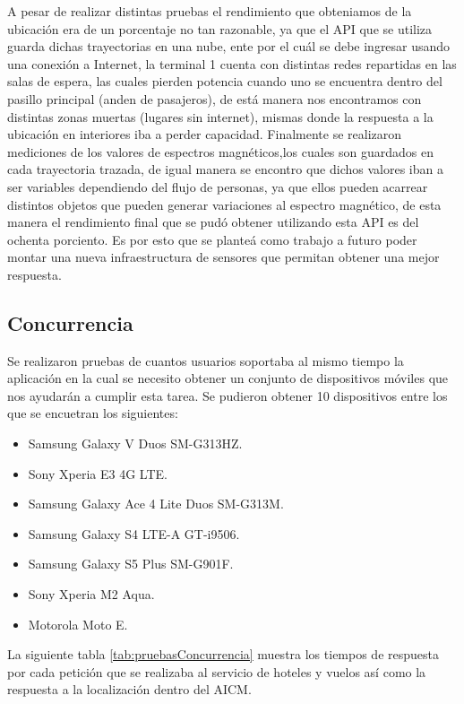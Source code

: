 A pesar de realizar distintas pruebas el rendimiento que obteniamos de la ubicación era de un porcentaje no tan razonable, ya que 
el API que se utiliza guarda dichas trayectorias en una nube, ente por el cuál se debe ingresar usando una conexión a Internet, 
la terminal 1 cuenta con distintas redes repartidas en las salas de espera, las cuales pierden potencia cuando uno se encuentra dentro 
del pasillo principal (anden de pasajeros), de está manera nos encontramos con distintas zonas muertas (lugares sin internet), 
mismas donde la respuesta a la ubicación en interiores iba a perder capacidad. 
Finalmente se realizaron mediciones de los valores de espectros magnéticos,los cuales son guardados en cada trayectoria trazada, 
de igual manera se encontro que dichos valores iban a ser variables dependiendo del flujo de personas, ya que ellos pueden acarrear 
distintos objetos que pueden generar variaciones al espectro magnético, de esta manera el rendimiento final que se pudó obtener utilizando 
esta API es del ochenta porciento. Es por esto que se planteá como trabajo a futuro poder montar una nueva infraestructura de sensores 
que permitan obtener una mejor respuesta.
\clearpage

\subsection{Concurrencia}
Se realizaron pruebas de cuantos usuarios soportaba al mismo tiempo la aplicación en la cual se necesito obtener un conjunto de 
dispositivos móviles que nos ayudarán a cumplir esta tarea. Se pudieron obtener 10 dispositivos entre los que se encuetran los siguientes: 

\begin{itemize}
\item Samsung Galaxy V Duos SM-G313HZ.
\item Sony Xperia E3 4G LTE.
\item Samsung Galaxy Ace 4 Lite Duos SM-G313M.
\item Samsung Galaxy S4 LTE-A GT-i9506.
\item Samsung Galaxy S5 Plus SM-G901F.
\item Sony Xperia M2 Aqua.
\item Motorola Moto E.
\end{itemize}

La siguiente tabla \ref{tab:pruebasConcurrencia} muestra los tiempos de respuesta por cada petición que se realizaba al servicio de 
hoteles y vuelos así como la respuesta a la localización dentro del AICM.

